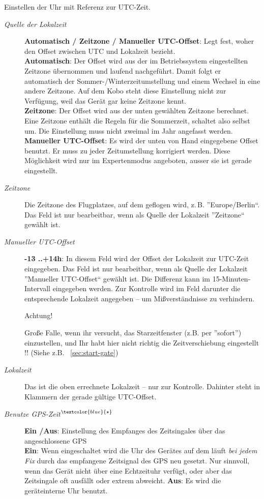 Einstellen der Uhr mit Referenz zur UTC-Zeit.

\begin{description}
\item[\textit{Quelle der Lokalzeit}] {\bf Automatisch / Zeitzone / Manueller UTC-Offset}: Legt fest, woher \xc den Offset zwischen UTC und Lokalzeit bezieht.\\
{\bf Automatisch}: Der Offset wird aus der im Betriebssystem eingestellten Zeitzone übernommen und laufend nachgeführt. Damit folgt er automatisch der Sommer-/Winterzeitumstellung und einem Wechsel in eine andere Zeitzone. Auf dem Kobo steht diese Einstellung nicht zur Verfügung, weil das Gerät gar keine Zeitzone kennt.\\
{\bf Zeitzone}: Der Offset wird aus der unten gewählten Zeitzone berechnet. Eine Zeitzone enthält die Regeln für die Sommerzeit, \xc schaltet also selbst um. Die Einstellung muss nicht zweimal im Jahr angefasst werden.\\
{\bf Manueller UTC-Offset}: Es wird der unten von Hand eingegebene Offset benutzt. Er muss zu jeder Zeitumstellung korrigiert werden. Diese Möglichkeit wird nur im Expertenmodus angeboten, ausser sie ist gerade eingestellt.
\item[\textit{Zeitzone}] Die Zeitzone des Flugplatzes, auf dem geflogen wird, z.\,B. ''Europe/Berlin``. Das Feld ist nur bearbeitbar, wenn als Quelle der Lokalzeit ''Zeitzone`` gewählt ist.
\item[\textit{Manueller UTC-Offset}]  {\bf -13 ..+14h}: In diesem Feld wird der Offset der Lokalzeit zur UTC-Zeit eingegeben. Das Feld ist nur bearbeitbar, wenn als Quelle der Lokalzeit ''Manueller UTC-Offset`` gewählt ist. Die Differenz kann im 15-Minuten-Intervall eingegeben werden.
Zur Kontrolle wird im Feld darunter die entsprechende Lokalzeit angegeben -- um Mißverständnisse zu verhindern.

Achtung! 

Große Falle, wenn ihr versucht, das Starzeitfenster (z.B. per ''sofort'') einzustellen, und Ihr habt \warning hier nicht richtig die Zeitverschiebung eingestellt !! (Siehe z.B. ~\ref{sec:start-gate})
\item[\textit{Lokalzeit}]  Das ist die oben errechnete Lokalzeit -- nur zur Kontrolle. Dahinter steht in Klammern der gerade gültige UTC-Offset.
\item[\textit{Benutze GPS-Zeit$^{\textcolor{blue}{\star}}$}] {\bf Ein /Aus}: Einstellung des Empfanges des Zeitsingales über das angeschlossene GPS\\
{\bf Ein}: Wenn eingeschaltet wird die Uhr des Gerätes auf dem \xc läuft \textsl{bei jedem Fix} durch das empfangene Zeitsignal des GPS neu gesetzt.
\achtung
Nur sinnvoll, wenn das Gerät nicht über eine Echtzeituhr verfügt, oder aber das Zeitsingale oft ausfällt oder extrem abweicht.
{\bf Aus}: Es wird die geräteinterne Uhr benutzt.
\end{description}


